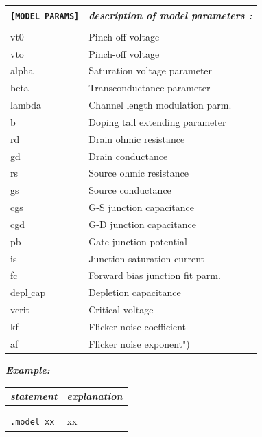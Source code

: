 \begin{longtable}{l l}		
\texttt{[MODEL PARAMS]} & \textit{description of model parameters :} \\ \hline \\ \vspace{-0.8\parskip}
																					{\small vt0} & {\small Pinch-off voltage} \\
 																					{\small vto} & {\small Pinch-off voltage} \\
 																					{\small alpha} & {\small Saturation voltage parameter} \\
																					{\small beta} & {\small Transconductance parameter} \\
																					{\small lambda} & {\small Channel length modulation parm.} \\
																					{\small b} & {\small Doping tail extending parameter} \\
																					{\small rd} & {\small Drain ohmic resistance} \\
																					{\small gd} & {\small Drain conductance} \\
																					{\small rs} & {\small Source ohmic resistance} \\
																					{\small gs} & {\small Source conductance} \\
																					{\small cgs} & {\small G-S junction capacitance} \\
																					{\small cgd} & {\small G-D junction capacitance} \\
																					{\small pb} & {\small Gate junction potential} \\
																					{\small is} & {\small Junction saturation current} \\
																					{\small fc} & {\small Forward bias junction fit parm.} \\
																					{\small depl$\_$cap} & {\small Depletion capacitance} \\
																					{\small vcrit} & {\small Critical voltage} \\
																					{\small kf} & {\small Flicker noise coefficient} \\
																					{\small af} & {\small Flicker noise exponent")}
\end{longtable}																				


\textbf{\textit{Example:}}

\begin{longtable}{l l}
\textit{statement} & \textit{explanation} \\ \hline \\ %
			\begin{minipage}{15em}{\texttt{xx}\\ 
			\texttt{.model xx}}\end{minipage}
			& \begin{minipage}{15em}{{\small xx}}\end{minipage} 
\end{longtable}

